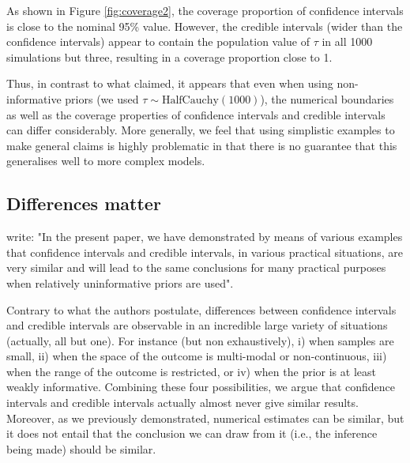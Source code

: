 \documentclass[a4paper,man,natbib,floatsintext,donotrepeattitle]{apa6}
\begin{document}
As shown in Figure \ref{fig:coverage2}, the coverage proportion of confidence intervals is close to the nominal 95\% value. However, the credible intervals (wider than the confidence intervals) appear to contain the population value of $\tau$ in all 1000 simulations but three, resulting in a coverage proportion close to 1.

Thus, in contrast to what \cite{albers_credible_2018} claimed, it appears that even when using non-informative priors (we used $\tau \sim \mathrm{HalfCauchy}(1000)$), the numerical boundaries as well as the coverage properties of confidence intervals and credible intervals can differ considerably. More generally, we feel that using simplistic examples to make general claims is highly problematic in that there is no guarantee that this generalises well to more complex models.

\subsection{Differences matter}

\cite{albers_credible_2018} write: "In the present paper, we have demonstrated by means of various examples that confidence intervals and credible intervals, in various practical situations, are very similar and will lead to the same conclusions for many practical purposes when relatively uninformative priors are used".

Contrary to what the authors postulate, differences between confidence intervals and credible intervals are observable in an incredible large variety of situations (actually, all but one). For instance (but non exhaustively), i) when samples are small, ii) when the space of the outcome is multi-modal or non-continuous, iii) when the range of the outcome is restricted, or iv) when the prior is at least weakly informative. Combining these four possibilities, we argue that confidence intervals and credible intervals actually almost never give similar results. Moreover, as we previously demonstrated, numerical estimates can be similar, but it does not entail that the conclusion we can draw from it (i.e., the inference being made) should be similar.


\end{document}
